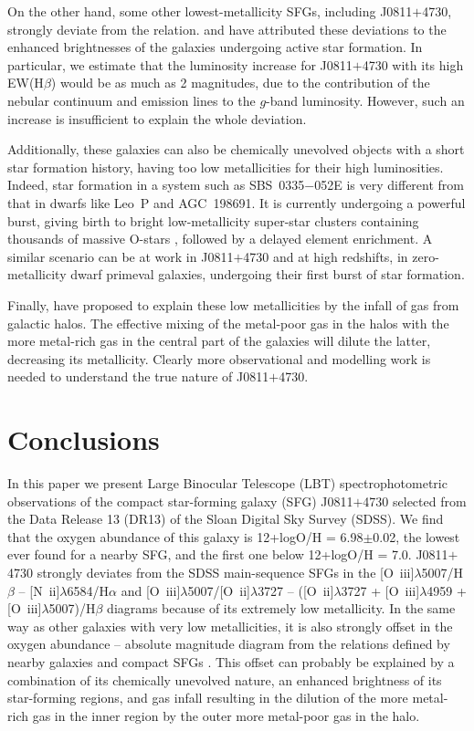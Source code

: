\documentclass[useAMS,usenatbib]{mn2e}
\begin{document}
On the other hand, some other lowest-metallicity SFGs, including 
J0811$+$4730, strongly deviate from the \citet{B12} relation.
\citet{I12} and \citet{G17} have attributed these deviations 
to the enhanced brightnesses of the galaxies undergoing  
active star formation. In particular, we estimate that the luminosity 
increase for J0811$+$4730
with its high EW(H$\beta$) would be as much as 2 magnitudes, due to the 
contribution of the nebular continuum and emission lines to the $g$-band 
luminosity. However, such an increase is insufficient to
explain the whole deviation.

Additionally, these galaxies can also be  
chemically unevolved objects with a short star formation history,  
having too low metallicities for their high luminosities. Indeed, 
star formation in a system such as SBS~0335$-$052E is very different from that
in dwarfs like Leo~P and AGC~198691. It is currently undergoing a powerful 
burst, giving birth to bright 
low-metallicity super-star clusters containing thousands of 
massive O-stars \citep*{TIL97}, followed by a delayed element enrichment. 
A similar scenario can be at work in J0811$+$4730 and at high redshifts, in 
zero-metallicity
dwarf primeval galaxies, undergoing their first burst of star formation.

Finally, \citet{EC10} have proposed to explain these low metallicities by 
the infall of gas from galactic halos. The effective mixing
of the metal-poor gas in the halos with the more metal-rich 
gas in the central part of the galaxies will dilute the latter, decreasing its metallicity. Clearly more 
observational and modelling work is needed to understand the true nature of J0811$+$4730.

\section{Conclusions}\label{sec:conclusions}

In this paper we present Large Binocular Telescope (LBT) 
spectrophotometric observations of the compact star-forming galaxy (SFG)
J0811$+$4730 selected from the Data Release 13 (DR13) of the Sloan Digital Sky
Survey (SDSS). We find that the oxygen abundance of this galaxy is 12+logO/H 
= 6.98$\pm$0.02, the lowest ever found for a nearby SFG, and the first one 
below 12+logO/H = 7.0. J0811$+$4730 strongly deviates from the SDSS
main-sequence SFGs in the [O~{\sc iii}]$\lambda$5007/H$\beta$ -- 
[N~{\sc ii}]$\lambda$6584/H$\alpha$ and 
[O~{\sc iii}]$\lambda$5007/[O~{\sc ii}]$\lambda$3727 -- 
([O~{\sc ii}]$\lambda$3727 + [O~{\sc iii}]$\lambda$4959 + 
[O~{\sc iii}]$\lambda$5007)/H$\beta$ diagrams because of its extremely low 
metallicity. In the same way as other galaxies with very low metallicities, it 
is also strongly offset in the oxygen abundance -- absolute magnitude 
diagram from the relations defined by nearby galaxies \citep{B12} and %
compact SFGs \citep{I16c}. This offset can probably be explained by a 
combination of its chemically unevolved nature, 
an enhanced brightness of its star-forming regions, 
and gas infall resulting in the dilution of the more metal-rich gas in 
the inner region by the outer more metal-poor gas in the halo.
\end{document}

